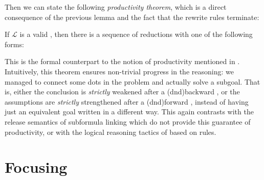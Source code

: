 Then we can state the following \emph{productivity theorem}, which is a direct
consequence of the previous lemma and the fact that the rewrite rules
terminate:

\begin{theorem}[Productivity]
If $\mathcal{L}$ is a valid , then there
is a sequence of reductions with one of the following forms:
\end{theorem}

This is the formal counterpart to the notion of productivity mentioned in
. Intuitively, this theorem ensures non-trivial progress in the
reasoning: we managed to connect some dots in the problem and actually solve a
subgoal. That is, either the conclusion is \emph{strictly} weakened after a
\kl(dnd){backward} , or the assumptions are \emph{strictly} strengthened after a
\kl(dnd){forward} , instead of having just an equivalent goal written in a different
way. This again contrasts with the
release semantics of subformula linking which do not provide this guarantee of
productivity, or with the logical reasoning tactics of  based on
 rules.

\section{Focusing}


